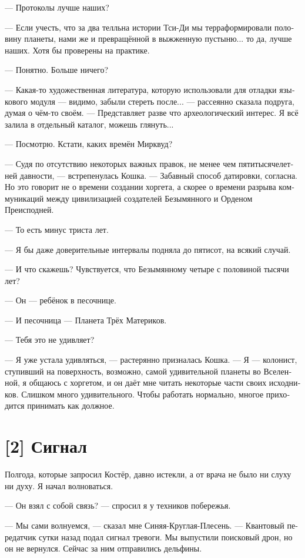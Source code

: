 \documentclass[a4paper,12pt,fleqn]{book}\usepackage{polyglossia}\setdefaultlanguage[babelshorthands=true]{russian}\setotherlanguage{english}\defaultfontfeatures{Ligatures=TeX,Mapping=tex-text}\usepackage{xcolor}\newcommand{\ml}[3]{#2}
\begin{document}
{--- Протоколы лучше наших?

--- Если учесть, что за два телльна истории Тси-Ди мы терраформировали половину планеты, нами же и превращённой в выжженную пустыню... то да, лучше наших.
Хотя бы проверены на практике.

--- Понятно.
Больше ничего?

--- Какая-то художественная литература, которую использовали для отладки языкового модуля --- видимо, забыли стереть после... --- рассеянно сказала подруга, думая о чём-то своём.
--- Представляет разве что археологический интерес.
Я всё залила в отдельный каталог, можешь глянуть...

--- Посмотрю.
Кстати, каких времён Мирквуд?

--- Судя по отсутствию некоторых важных правок, не менее чем пятитысячелетней давности, --- встрепенулась Кошка.
--- Забавный способ датировки, согласна.
Но это говорит не о времени создании хоргета, а скорее о времени разрыва коммуникаций между цивилизацией создателей Безымянного и Орденом Преисподней.

--- То есть минус триста лет.

--- Я бы даже доверительные интервалы подняла до пятисот, на всякий случай.

--- И что скажешь?
Чувствуется, что Безымянному четыре с половиной тысячи лет?

--- Он --- ребёнок в песочнице.

--- И песочница --- Планета Трёх Материков.

--- Тебя это не удивляет?

--- Я уже устала удивляться, --- растерянно призналась Кошка.
--- Я --- колонист, ступивший на поверхность, возможно, самой удивительной планеты во Вселенной, я общаюсь с хоргетом, и он даёт мне читать некоторые части своих исходников.
Слишком много удивительного.
Чтобы работать нормально, многое приходится принимать как должное.

\section{[2] Сигнал}

Полгода, которые запросил Костёр, давно истекли, а от врача не было ни слуху ни духу.
Я начал волноваться.

--- Он взял с собой связь? --- спросил я у техников побережья.

--- Мы сами волнуемся, --- сказал мне Синяя-Круглая-Плесень.
--- Квантовый передатчик сутки назад подал сигнал тревоги.
Мы выпустили поисковый дрон, но он не вернулся.
Сейчас за ним отправились дельфины.

}
\end{document}
